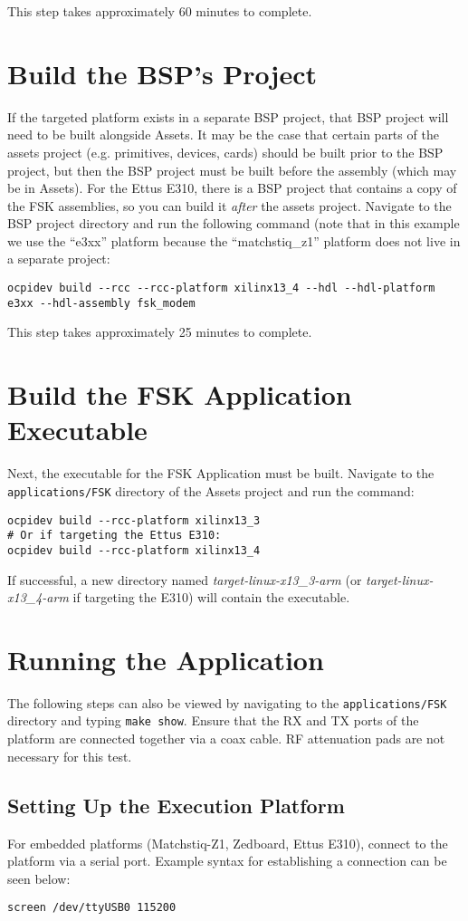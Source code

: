 \begin{flushleft}
This step takes approximately 60 minutes to complete.

\section{Build the BSP's Project}
If the targeted platform exists in a separate BSP project, that BSP project will need to be built alongside Assets. It may be the case that certain parts of the assets project (e.g. primitives, devices, cards) should be built prior to the BSP project, but then the BSP project must be built before the assembly (which may be in Assets). For the Ettus E310, there is a BSP project that contains a copy of the FSK assemblies, so you can build it \textit{after} the assets project. Navigate to the BSP project directory and run the following command (note that in this example we use the ``e3xx'' platform because the ``matchstiq\_z1'' platform does not live in a separate project:
\begin{verbatim}
ocpidev build --rcc --rcc-platform xilinx13_4 --hdl --hdl-platform e3xx --hdl-assembly fsk_modem
\end{verbatim}
This step takes approximately 25 minutes to complete.


\section{Build the FSK Application Executable}
Next, the executable for the FSK Application must be built. Navigate to the \texttt{applications/FSK} directory of the Assets project and run the command:
\begin{verbatim}
ocpidev build --rcc-platform xilinx13_3
# Or if targeting the Ettus E310:
ocpidev build --rcc-platform xilinx13_4
\end{verbatim}
	If successful, a new directory named \textit{target-linux-x13\_3-arm} (or \textit{target-linux-x13\_4-arm} if targeting the E310) will contain the executable.

\section{Running the Application}
The following steps can also be viewed by navigating to the \texttt{applications/FSK} directory and typing \texttt{make show}. Ensure that the RX and TX ports of the platform are connected together via a coax cable. RF attenuation pads are not necessary for this test.
\subsection{Setting Up the Execution Platform}
For embedded platforms (Matchstiq-Z1, Zedboard, Ettus E310), connect to the platform via a serial port. Example syntax for establishing a connection can be seen below:
\begin{verbatim}
screen /dev/ttyUSB0 115200
\end{verbatim}

\end{flushleft}
